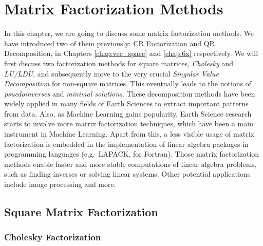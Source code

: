 \chapter{Matrix Factorization Methods}

In this chapter, we are going to discuss some matrix factorization methods. We have introduced two of them previously: CR Factorization and QR Decomposition, in Chapters \ref{chap:vec_space} and \ref{chap:6x} respectively. We will first discuss two factorization methods for square matrices, \textit{Cholesky} and \textit{LU/LDU}, and subsequently move to the very crucial \textit{Singular Value Decomposition} for non-square matrices. This eventually leads to the notions of \textit{psuedoinverses} and \textit{minimal solutions}. These decomposition methods have been widely applied in many fields of Earth Sciences to extract important patterns from data. Also, as Machine Learning gains popularity, Earth Science research starts to involve more matrix factorization techniques, which have been a main instrument in Machine Learning. Apart from this, a less visible usage of matrix factorization is embedded in the implementation of linear algebra packages in programming languages (e.g.\ LAPACK, for Fortran). Those matrix factorization methods enable faster and more stable computations of linear algebra problems, such as finding inverses or solving linear systems. Other potential applications include image processing and more.

\section{Square Matrix Factorization}
\subsection{Cholesky Factorization}

